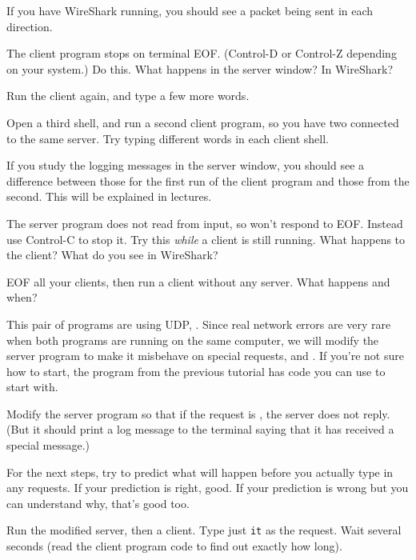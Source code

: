 If you have WireShark running, you should see a packet being sent in each direction.

The client program stops on terminal EOF. (Control-D or Control-Z depending on your
system.) Do this. What happens in the server window? In WireShark?

Run the client again, and type a few more words.

Open a third shell, and run a second client program, so you have two connected to the
same server. Try typing different words in each client shell.

\begin{IMPORTANT}
If you study the logging messages in the server window, you should see a difference
between those for the first run of the client program and those from the second.
This will be explained in lectures.
\end{IMPORTANT}

The server program does not read from input, so won't respond to EOF. Instead use
Control-C to stop it. Try this \emph{while} a client is still running. What happens
to the client? What do you see in WireShark?

EOF all your clients, then run a client without any server. What happens and when?



This pair of programs are using UDP, . Since real
network errors are very rare when both programs are running on the same computer,
we will modify the server program to make it misbehave on special requests,
 and . If you're not sure how to start, the  program
from the previous tutorial has code you can use to start with.

\STEP Modify the server program so that if the request is , the server does
not reply. (But it should print a log message to the terminal saying that it has
received a special message.)

\begin{IMPORTANT}
For the next steps, try to predict what will happen before you actually type in any
requests. If your prediction is right, good. If your prediction is wrong but you
can understand why, that's good too.
\end{IMPORTANT}

Run the modified server, then a client. Type just \texttt{it} as the request. Wait
several seconds (read the client program code to find out exactly how long).

